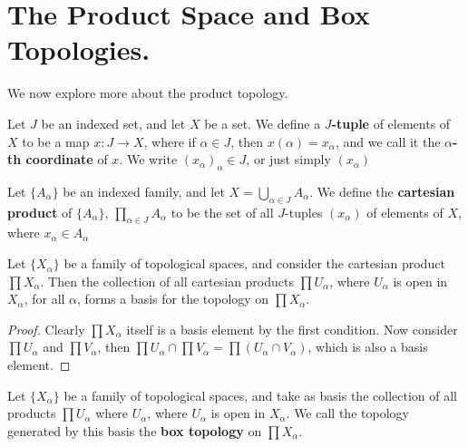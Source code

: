 
\section{The Product Space and Box Topologies.}

We now explore more about the product topology.

\begin{definition}
    Let $J$ be an indexed set, and let  $X$ be a set. We define a  \textbf{$J$-tuple} of elements of
    $X$ to be a map $x:J \rightarrow X$, where if  $\alpha \in J$, then  $x(\alpha)=x_{\alpha}$, and
    we call it the \textbf{$\alpha$-th coordinate} of $x$. We write  $(x_{\alpha})_\alpha \in J$, or
just simply $(x_{\alpha})$
\end{definition}

\begin{definition}
Let $\{A_{\alpha}\}$ be an indexed family, and let $X=\bigcup_{\alpha \in J}{A_{\alpha}}$. We define
the \textbf{cartesian product} of $\{A_{\alpha}\}$, $\prod_{\alpha \in J}{A_\alpha}$ to be the set of
all $J$-tuples  $(x_{\alpha})$ of elements of $X$, where  $x_{\alpha} \in A_{\alpha}$
\end{definition}

\begin{theorem}\label{2.1.1}
    Let $\{X_{\alpha}\}$ be a family of topological spaces, and consider the cartesian product
    $\prod{X_{\alpha}}$. Then the collection of all cartesian products $\prod{U_{\alpha}}$, where
    $U_{\alpha}$ is open in $X_{\alpha}$, for all $\alpha$, forms a basis for the topology on
    $\prod{X_{\alpha}}$.
\end{theorem}
\begin{proof}
    Clearly $\prod{X_{\alpha}}$ itself is a basis element by the first condition. Now consider
    $\prod{U_{\alpha}}$ and $\prod{V_{\alpha}}$, then $\prod{U_{\alpha}} \cap
    \prod{V_{\alpha}}=\prod{(U_{\alpha} \cap V_{\alpha})}$, which is also a basis
    element.
\end{proof}

\begin{definition}
Let $\{X_{\alpha}\}$ be a family of topological spaces, and take as basis the collection of all
    products $\prod{U_{\alpha}}$ where $U_{\alpha}$, where $U_{\alpha}$ is open in $X_{\alpha}$.
    We call the topology generated by this basis the \textbf{box topology} on $\prod{X_{\alpha}}$.
\end{definition}

